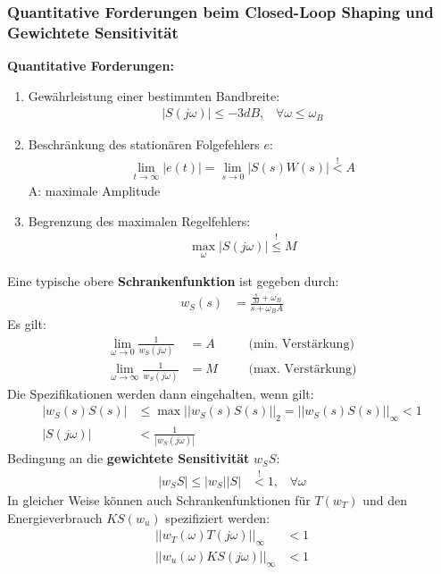 \documentclass[a4paper,twocolumn,10pt]{article}
\begin{document}
\subsubsection{Quantitative Forderungen beim Closed-Loop Shaping und Gewichtete Sensitivität}
\textbf{Quantitative Forderungen:}
\begin{enumerate}[label=$\bullet$]
\item Gewährleistung einer bestimmten Bandbreite:
\begin{align*}
|S(j\omega)|\leq -3dB,\;\;\;\forall\omega\leq \omega_B
\end{align*}
\item Beschränkung des stationären Folgefehlers $e$:
\begin{align*}
\lim\limits_{t\rightarrow\infty}|e(t)|=\lim\limits_{s\rightarrow 0}|S(s)W(s)|\overset{!}{<}A
\end{align*}
A: maximale Amplitude
\item Begrenzung des maximalen Regelfehlers:
\begin{align*}
\max\limits_{\omega}|S(j\omega)|\overset{!}{\leq}M
\end{align*}
\end{enumerate}
Eine typische obere \textbf{Schrankenfunktion} ist gegeben durch:
\begin{align*}
w_S(s)&=\frac{\frac{s}{M}+\omega_B}{s+\omega_BA}
\end{align*}
Es gilt:
\begin{align*}
\lim\limits_{\omega\rightarrow 0}\frac{1}{w_S(j\omega)}&=A&\;\;\;\;\;\;\text{(min. Verstärkung)}\\
\lim\limits_{\omega\rightarrow \infty}\frac{1}{w_S(j\omega)}&=M&\;\;\;\;\;\;\text{(max. Verstärkung)}
\end{align*}
Die Spezifikationen werden dann eingehalten, wenn gilt:
\begin{align*}
|w_S(s)S(s)|&\leq\max||w_S(s)S(s)||_2=||w_S(s)S(s)||_{\infty}<1\\
|S(j\omega)|&<\frac{1}{|w_S(j\omega)|}
\end{align*}
Bedingung an die \textbf{gewichtete Sensitivität} $w_SS$:
\begin{align*}
|w_SS|\leq|w_S||S|&\overset{!}{<}1,\;\;\;\forall\omega
\end{align*}
In gleicher Weise können auch Schrankenfunktionen für $T(w_T)$ und den Energieverbrauch $KS(w_u)$ spezifiziert werden:
\begin{align*}
||w_T(\omega)T(j\omega)||_{\infty}&<1\\
||w_u(\omega)KS(j\omega)||_{\infty}&<1
\end{align*}
\end{document}
